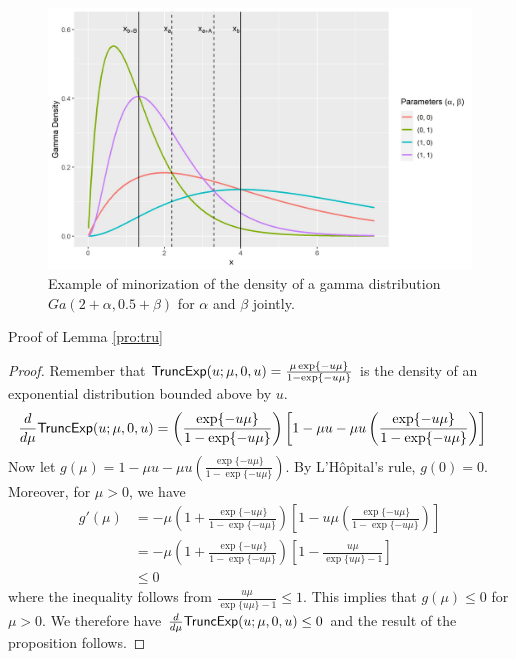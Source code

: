 \documentclass[11pt]{article}
\begin{document}
	
	\begin{figure}	
		\centering
		\includegraphics[width=\textwidth]{gamma_minorization_2.jpg}
		\caption{Example of minorization of the density of a gamma distribution $Ga(2+\alpha, 0.5+\beta)$ for $\alpha$ and $\beta$ jointly.}
		\label{fig:gam2}
	\end{figure}
	
	Proof of Lemma \ref{pro:tru}
	
	\begin{proof}
		Remember that $\textsf{TruncExp}(u; \mu, 0, u) = \frac{\mu \exp\{-u\mu\}}{1-\exp\{-u\mu\}}$ is the density of an exponential distribution bounded above by $u$.
		\begin{align*}
			\frac{d}{d\mu}\textsf{TruncExp}(u; \mu, 0, u)
			& = \left(\frac{\exp\{-u\mu\}}{1-\exp\{-u\mu\}} \right) \left[ 1-\mu u - \mu u \left(\frac{\exp\{-u\mu\}}{1-\exp\{-u\mu\}} \right) \right]
		\end{align*}
		Now let $g(\mu) = 1-\mu u - \mu u \left(\frac{\exp\{-u\mu\}}{1-\exp\{-u\mu\}} \right)$. By L'H\^{o}pital's rule, $g(0) = 0$. Moreover, for $\mu>0$, we have
		\begin{align*}
			g'(\mu)
			& = - \mu \left(1+\frac{\exp\{-u\mu\}}{1-\exp\{-u\mu\}} \right) \left[ 1-u\mu \left(\frac{\exp\{-u\mu\}}{1-\exp\{-u\mu\}} \right) \right]  \\
			& = - \mu \left(1+\frac{\exp\{-u\mu\}}{1-\exp\{-u\mu\}} \right) \left[ 1- \frac{u\mu}{\exp\{u\mu\}-1} \right] \\
			& \le 0
		\end{align*}
		where the inequality follows from $\frac{u\mu}{\exp\{u\mu\}-1}\le1$.
		This implies that $g(\mu) \le 0$ for $\mu>0$. We therefore have $\frac{d}{d\mu}\textsf{TruncExp}(u; \mu, 0, u) \le 0$ and the result of the proposition follows.
	\end{proof}
	
	
	
	
	
	
\end{document}
